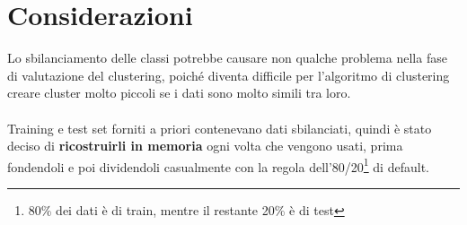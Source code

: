 \section{Considerazioni}
Lo sbilanciamento delle classi potrebbe causare non qualche problema nella fase di valutazione del clustering, poiché diventa difficile per l'algoritmo di clustering creare cluster molto piccoli se i dati sono molto simili tra loro.\\
\\
Training e test set forniti a priori contenevano dati sbilanciati, quindi è stato deciso di \textbf{ricostruirli in memoria} ogni volta che vengono usati, prima fondendoli e poi dividendoli casualmente con la regola dell'80/20\footnote{80\% dei dati è di train, mentre il restante 20\% è di test} di default.
